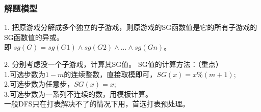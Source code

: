 \subsubsection{解题模型}


\indent

1. 把原游戏分解成多个独立的子游戏，则原游戏的SG函数值是它的所有子游戏的SG函数值的异或。\\
即 \textbf{$sg(G)=sg(G1) \wedge sg(G2) \wedge ... \wedge sg(Gn)$}。

\indent

2. 分别考虑没一个子游戏，计算其SG值。
    SG值的计算方法：（重点）\\
    1.可选步数为$1-m$的连续整数，直接取模即可，$SG(x) = x \% (m+1)$;\\
    2.可选步数为任意步，$SG(x) = x$;\\
    3.可选步数为一系列不连续的数，用模板计算。\\

\indent
一般DFS只在打表解决不了的情况下用，首选打表预处理。
